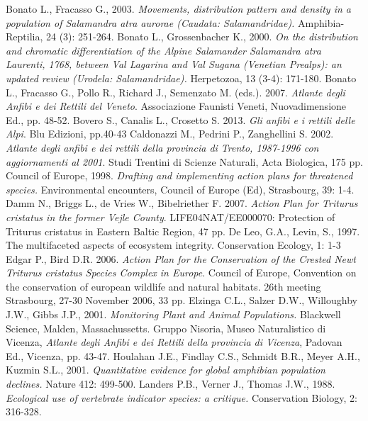 \documentclass[10pt,twoside,openany,x11names,svgnames,italian,a5paper,dvipsnames,table]{memoir}
\begin{document}
\begin{thebibliography}{9}
 Bonato L., Fracasso G., 2003. \emph{Movements, distribution pattern and density in a population of \emph{Salamandra atra aurorae} (\emph{Caudata}: \emph{Salamandridae}).} Amphibia-Reptilia, 24 (3): 251-264.
 Bonato L., Grossenbacher K., 2000. \emph{On the distribution and chromatic differentiation of the Alpine Salamander \emph{Salamandra atra} Laurenti, 1768, between Val Lagarina and Val Sugana (Venetian Prealps): an updated review (\emph{Urodela}: \emph{Salamandridae}).} Herpetozoa, 13 (3-4): 171-180.
Bonato L., Fracasso G., Pollo R., Richard J., Semenzato M. (eds.). 2007. \emph{Atlante degli Anfibi e dei Rettili del Veneto}. Associazione Faunisti Veneti, Nuovadimensione Ed., pp. 48-52.
Bovero S., Canalis L., Crosetto S. 2013. \emph{Gli anfibi e i rettili delle Alpi}. Blu Edizioni, pp.40-43
Caldonazzi M., Pedrini P., Zanghellini S. 2002. \emph{Atlante degli anfibi e dei rettili della provincia di Trento, 1987-1996 con aggiornamenti al 2001}. Studi Trentini di Scienze Naturali, Acta Biologica, 175 pp.
 Council of Europe, 1998. \emph{Drafting and implementing action plans for threatened species.} Environmental encounters, Council of Europe (Ed), Strasbourg, 39: 1-4.
Damm N., Briggs L., de Vries W., Bibelriether F. 2007. \emph{Action Plan for Triturus cristatus in the former Vejle County}. LIFE04NAT/EE000070: Protection of Triturus cristatus in Eastern Baltic Region, 47 pp.
 De Leo, G.A., Levin, S., 1997. The multifaceted aspects of ecosystem integrity. Conservation Ecology, 1: 1-3
Edgar P., Bird D.R. 2006. \emph{Action Plan for the Conservation of the Crested Newt Triturus cristatus Species Complex in Europe}. Council of Europe, Convention on the conservation of european wildlife and natural habitats. 26th meeting Strasbourg, 27-30 November 2006, 33 pp.
 Elzinga C.L., Salzer D.W., Willoughby J.W., Gibbs J.P., 2001. \emph{Monitoring Plant and Animal Populations.} Blackwell Science, Malden, Massachussetts.
 Gruppo Nisoria, Museo Naturalistico di Vicenza, \emph{Atlante degli Anfibi e dei Rettili della provincia di Vicenza}, Padovan Ed., Vicenza, pp. 43-47.
 Houlahan J.E., Findlay C.S., Schmidt B.R., Meyer A.H., Kuzmin S.L., 2001. \emph{Quantitative evidence for global amphibian population declines.} Nature 412: 499-500.
Landers P.B., Verner J., Thomas J.W., 1988. \emph{Ecological use of vertebrate indicator species: a critique.} Conservation Biology, 2: 316-328.

\end{thebibliography}
\end{document}

